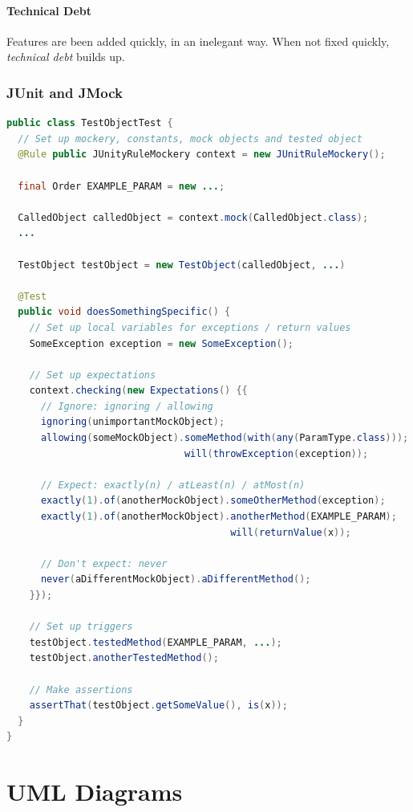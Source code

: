 \documentclass[twocolumn,english]{article}
\begin{document}
\paragraph{Technical Debt}

Features are been added quickly, in an inelegant way. When not fixed
quickly, \emph{technical debt} builds up.

\subsubsection*{JUnit and JMock}

\begin{lstlisting}[language=Java,basicstyle={\footnotesize\ttfamily},commentstyle={\color{gray}\itshape}]
public class TestObjectTest {
  // Set up mockery, constants, mock objects and tested object
  @Rule public JUnityRuleMockery context = new JUnitRuleMockery();

  final Order EXAMPLE_PARAM = new ...;

  CalledObject calledObject = context.mock(CalledObject.class);
  ...

  TestObject testObject = new TestObject(calledObject, ...)

  @Test
  public void doesSomethingSpecific() {
    // Set up local variables for exceptions / return values
    SomeException exception = new SomeException();

    // Set up expectations
    context.checking(new Expectations() {{
      // Ignore: ignoring / allowing
      ignoring(unimportantMockObject);
      allowing(someMockObject).someMethod(with(any(ParamType.class)));
                               will(throwException(exception));

      // Expect: exactly(n) / atLeast(n) / atMost(n)
      exactly(1).of(anotherMockObject).someOtherMethod(exception);
      exactly(1).of(anotherMockObject).anotherMethod(EXAMPLE_PARAM);
                                       will(returnValue(x));

      // Don't expect: never
      never(aDifferentMockObject).aDifferentMethod();
    }});
    
    // Set up triggers
    testObject.testedMethod(EXAMPLE_PARAM, ...);
    testObject.anotherTestedMethod();

    // Make assertions
    assertThat(testObject.getSomeValue(), is(x));
  }
}
\end{lstlisting}

\section{UML Diagrams}
\end{document}
